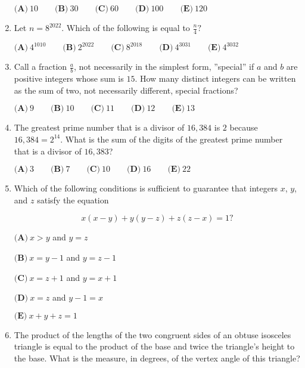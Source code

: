 \documentclass{article}
\begin{document}
\begin{enumerate}[label=\arabic*., itemsep=0.5em]
\(\textbf{(A)}\: 10\qquad\textbf{(B)} \: 30\qquad\textbf{(C)} \: 60\qquad\textbf{(D)} \: 100\qquad\textbf{(E)} \: 120\)\par \vspace{0.5em}\item Let \(n=8^{2022}\). Which of the following is equal to \(\frac{n}{4}?\)

\(\textbf{(A)}\: 4^{1010}\qquad\textbf{(B)} \: 2^{2022}\qquad\textbf{(C)} \: 8^{2018}\qquad\textbf{(D)} \: 4^{3031}\qquad\textbf{(E)} \: 4^{3032}\)\par \vspace{0.5em}\item Call a fraction \(\frac{a}{b}\), not necessarily in the simplest form, ''special'' if \(a\) and \(b\) are positive integers whose sum is \(15\). How many distinct integers can be written as the sum of two, not necessarily different, special fractions?

\(\textbf{(A)}\ 9 \qquad\textbf{(B)}\  10 \qquad\textbf{(C)}\  11 \qquad\textbf{(D)}\ 12 \qquad\textbf{(E)}\ 13\)\par \vspace{0.5em}\item The greatest prime number that is a divisor of \(16{,}384\) is \(2\) because \(16{,}384 = 2^{14}\). What is the sum of the digits of the greatest prime number that is a divisor of \(16{,}383\)?

\(\textbf{(A)} \: 3\qquad\textbf{(B)} \: 7\qquad\textbf{(C)} \: 10\qquad\textbf{(D)} \: 16\qquad\textbf{(E)} \: 22\)\par \vspace{0.5em}\item Which of the following conditions is sufficient to guarantee that integers \(x\), \(y\), and \(z\) satisfy the equation

\begin{equation*}
x(x-y)+y(y-z)+z(z-x) = 1?
\end{equation*}


\(\textbf{(A)} \: x>y\) and \(y=z\)

\(\textbf{(B)} \: x=y-1\) and \(y=z-1\)

\(\textbf{(C)} \: x=z+1\) and \(y=x+1\)

\(\textbf{(D)} \: x=z\) and \(y-1=x\)

\(\textbf{(E)} \: x+y+z=1\)\par \vspace{0.5em}\item The product of the lengths of the two congruent sides of an obtuse isosceles triangle is equal to the product of the base and twice the triangle's height to the base. What is the measure, in degrees, of the vertex angle of this triangle?


\end{enumerate}
\end{document}
